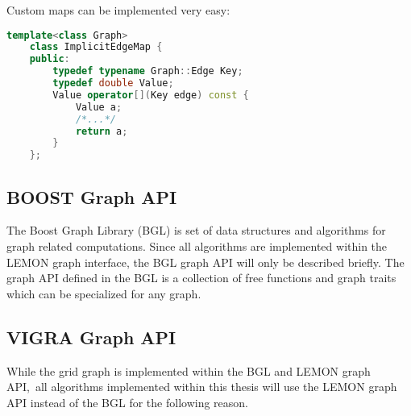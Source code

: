     Custom maps can be implemented very easy:

    \begin{minipage}{\textwidth}\vspace{-0.75cm}\begin{lstlisting}[language=c++]
    template<class Graph>
    class ImplicitEdgeMap {
    public:
        typedef typename Graph::Edge Key;
        typedef double Value;
        Value operator[](Key edge) const { 
            Value a;
            /*...*/
            return a;
        }
    };
    \end{lstlisting}\end{minipage}\vspace{0.5cm}

\subsection{BOOST Graph API}\label{sec:boost_graph_apis}
The Boost Graph Library (BGL)  \cite{software_bgl} is set of data structures and 
algorithms for graph related computations.
Since all algorithms are implemented within the LEMON graph interface, 
the BGL graph API will only be described briefly.
The graph API defined in the BGL is a collection of
free functions and graph traits which can be specialized for
any graph.




\subsection{VIGRA Graph API}

While the grid graph is implemented within the BGL and LEMON graph API,\
all algorithms implemented within this thesis will
use the LEMON graph API instead of the BGL 
for the following reason.

